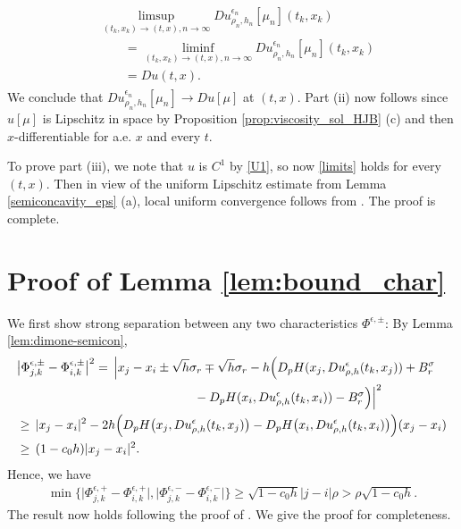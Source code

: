 \documentclass[a4paper,  twoside, 10pt, leqno]{amsart}
\theoremstyle{remark}
\theoremstyle{definition}
\begin{document}
 \begin{align}\label{limits}
 \begin{split}
     &\limsup_{(t_k, x_k)\to (t,x), n\to \infty } Du_{\rho_{n}, h_{n}}^{\epsilon_{n}} [ \mu_{n} ](t_k, x_k)\\
     &\qquad= \liminf_{(t_k, x_k)\to (t,x), n\to \infty } Du_{\rho_{n}, h_{n}}^{\epsilon_{n}} [ \mu_{n} ](t_k, x_k)\\
     &\qquad = Du(t,x). 
     \end{split}
 \end{align}
 We conclude that $Du_{\rho_{n}, h_{n}}^{\epsilon_{n}} [ \mu_{n} ] \rightarrow Du [ \mu ]$ at $(t,x)$.
Part (ii) now follows since $u[\mu]$ is Lipschitz in space by Proposition \ref{prop:viscosity_sol_HJB} (c) and then $x$-differentiable for a.e. $x$ and every $t$.
 
To prove part (iii), we note that $u$ is $C^1$ by \ref{U1}, so now \eqref{limits} holds for every $(t,x)$. Then in view of the uniform Lipschitz estimate from Lemma \ref{semiconcavity_eps} (a), local uniform convergence follows from \cite[Chapter V, Lemma 1.9]{BCD:book}. The proof is complete.

\section{Proof of Lemma \ref{lem:bound_char}}\label{app:pf}
We first show strong separation between any two characteristics $\Phi^{\epsilon,\pm}$: By Lemma \ref{lem:dimone-semicon},
\begin{align*}
&\big|\Phi^{\epsilon,\pm}_{j,k} - \Phi^{\epsilon,\pm}_{i,k}\big|^2  = \, \Big|x_j-x_i  \pm \sqrt{h}\sigma_r \mp \sqrt{h}\sigma_r - h\Big(D_p H(x_j,Du^{\epsilon}_{\rho,h}(t_k,x_j)) + B^{\sigma}_r \\
 & \hspace*{5cm} - D_p H(x_i,Du^{\epsilon}_{\rho,h}(t_k,x_i)) - B^{\sigma}_r\Big) \Big|^2\\
 &\geq  \, |x_j-x_i|^2 - 2 h \Big(D_pH\big(x_j,Du^{\epsilon}_{\rho,h}(t_k,x_j)\big)- D_p H \big(x_i, Du^{\epsilon}_{\rho,h}(t_k,x_i)\big)\Big) (x_j-x_i) \\
 & \geq  \, (1-c_0 h) |x_j-x_i|^2.
\end{align*}  
Hence, we have 
\begin{align}\label{dist_char}
\min\Big\{\big|\Phi^{\epsilon,+}_{j,k} - \Phi^{\epsilon,+}_{i,k}\big|, \big|\Phi^{\epsilon,-}_{j,k} - \Phi^{\epsilon,-}_{i,k}\big|\Big\} \geq \sqrt{1-c_0h} |j-i|\rho> \rho \sqrt{1-c_0h} .
\end{align}
The result now holds following the proof of \cite[Lemma 3.8]{carliniSilva2014semi1st}. We give the proof for completeness. 
\end{document}
